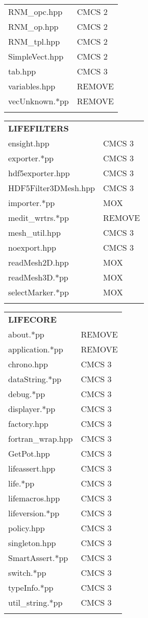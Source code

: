 \documentclass[10p]{article}
\theoremstyle{definition}
\begin{document}
\begin{landscape}
\begin{table}[!h]
\begin{multicols}{4}
\begin{xtabular}{
p{0.20\textwidth}<{}|
p{0.10\textwidth}<{}
}
RNM\_opc.hpp & CMCS 2\\
RNM\_op.hpp & CMCS 2\\
RNM\_tpl.hpp & CMCS 2\\
SimpleVect.hpp & CMCS 2\\
tab.hpp & CMCS 3\\
variables.hpp & REMOVE\\
vecUnknown.*pp & REMOVE\\
& \\
\end{xtabular}
\begin{xtabular}{
p{0.20\textwidth}<{}|
p{0.1\textwidth}<{}
}
\textbf{LIFEFILTERS} \\
ensight.hpp & CMCS 3\\
exporter.*pp & CMCS 3\\
hdf5exporter.hpp & CMCS 3\\
HDF5Filter3DMesh.hpp & CMCS 3\\
importer.*pp & MOX\\
medit\_wrtrs.*pp & REMOVE\\
mesh\_util.hpp & CMCS 3\\
noexport.hpp & CMCS 3\\
readMesh2D.hpp & MOX\\
readMesh3D.*pp & MOX\\
selectMarker.*pp & MOX\\
& \\
\end{xtabular}
\begin{xtabular}{
p{0.18\textwidth}<{}|
p{0.1\textwidth}<{}
}
\textbf{LIFECORE} \\
about.*pp & REMOVE\\
application.*pp & REMOVE\\
chrono.hpp & CMCS 3\\
dataString.*pp & CMCS 3\\
debug.*pp & CMCS 3\\
displayer.*pp & CMCS 3\\
factory.hpp & CMCS 3\\
fortran\_wrap.hpp & CMCS 3\\
GetPot.hpp & CMCS 3\\
lifeassert.hpp & CMCS 3\\
life.*pp & CMCS 3\\
lifemacros.hpp & CMCS 3\\
lifeversion.*pp & CMCS 3\\
policy.hpp & CMCS 3\\
singleton.hpp & CMCS 3\\
SmartAssert.*pp & CMCS 3\\
switch.*pp & CMCS 3\\
typeInfo.*pp & CMCS 3\\
util\_string.*pp & CMCS 3\\
& \\
\end{xtabular}


\end{multicols}
\end{table}
\end{landscape}
\end{document}
